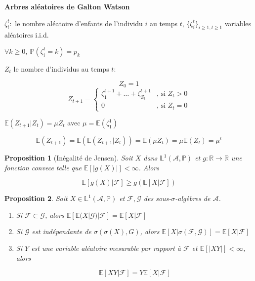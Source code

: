 \documentclass[10pt,a4paper,oneside]{article}
\newtheorem{proposition}{Proposition}
\begin{document}
\textbf{Arbres aléatoires de Galton Watson}

$\zeta_i^t:$ le nombre aléatoire d'enfants de l'individu $i$ au temps $t$, $\{ \zeta_i^t \}_{i \geq 1, t \geq 1}$ variables aléatoires i.i.d.

$\forall k \geq 0,\ \mathbb{P}(\zeta_i^t = k) = p_k$

$Z_t$ le nombre d'individus au temps $t$:

\[ Z_0 = 1 \]
\[ Z_{t + 1} = \begin{cases}
\zeta_1^{t + 1} + \ldots + \zeta_{Z_t}^{t + 1}&\text{, si } Z_t > 0 \\
0 &\text{, si } Z_t = 0
\end{cases}\]

$\mathbb{E}(Z_{t + 1} | Z_t) = \mu Z_t$ avec $\mu = \mathbb{E}(\zeta_1^1)$

\[ \mathbb{E}(Z_{t + 1}) = \mathbb{E}(\mathbb{E}(Z_{t + 1} | Z_t)) = \mathbb{E}(\mu Z_t) = \mu \mathbb{E}(Z_t) = \mu^t \]

\begin{proposition}[Inégalité de Jensen]
Soit $X$ dans $\mathbb{L}^1(\mathcal{A},\mathbb{P})$ et $g : \mathbb{R} \to \mathbb{R}$ une fonction convece telle que $\mathbb{E}[|g(X)|] < \infty$. Alors

\[ \mathbb{E}[g(X) | \mathcal{F}] \geq g(\mathbb{E}[X | \mathcal{F}]) \]
\end{proposition}

\begin{proposition}
Soit $X \in \mathbb{L}^1(\mathcal{A},\mathbb{P})$ et $\mathcal{F},\mathcal{G}$ des sous-$\sigma$-algèbres de $\mathcal{A}$.

\begin{enumerate}
\item
Si $\mathcal{F} \subset \mathcal{G}$, alors $ \mathbb{E}[ \mathbb{E}(X | \mathcal{G}) | \mathcal{F} ] = \mathbb{E}[X | \mathcal{F}] $

\item
Si $\mathcal{G}$ est indépendante de $\sigma(\sigma(X),G)$, alors $\mathbb{E}[X | \sigma(\mathcal{F},\mathcal{G})] = \mathbb{E}[X | \mathcal{F}]$

\item
Si $Y$ est une variable aléatoire mesurable par rapport à $\mathcal{F}$ et $\mathbb{E}[|XY|] < \infty$, alors

\[ \mathbb{E}[XY | \mathcal{F}] = Y \mathbb{E}[X | \mathcal{F}] \]
\end{enumerate}
\end{proposition}
\end{document}
